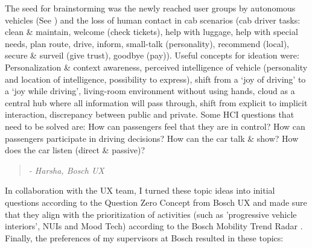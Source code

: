 The seed for brainstorming was the newly reached user groups by autonomous vehicles (See  ) and the loss of human contact in cab scenarios (cab driver tasks: clean \& maintain, welcome (check tickets), help with luggage, help with special needs, plan route, drive, inform, small-talk (personality), recommend (local), secure \& surveil (give trust), goodbye (pay)). Useful concepts for ideation were: Personalization \& context awareness, perceived intelligence of vehicle (personality and location of intelligence, possibility to express), shift from a ‘joy of driving’ to a ‘joy while driving’, living-room environment without using hands, cloud as a central hub where all information will pass through, shift from explicit to implicit interaction, discrepancy between public and private. Some HCI questions that need to be solved are: How can passengers feel that they are in control? How can passengers participate in driving decisions? How can the car talk \& show? How does the car listen (direct \& passive)?

\begin{quotation}\emph{ - Harsha, Bosch UX}\end{quotation}

In collaboration with the UX team, I turned these topic ideas into initial questions according to the Question Zero Concept from Bosch UX \cite{RobertBoschUX2017QuestionZero} and made sure that they align with the prioritization of activities (such as 'progressive vehicle interiors', NUIs and Mood Tech) according to the Bosch Mobility Trend Radar \cite{RobertBoschNA2017RegionalRegional}. 
Finally, the preferences of my supervisors at Bosch resulted in these topics:

